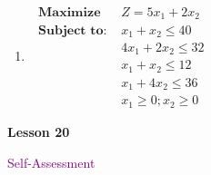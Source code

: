 \documentclass[10pt]{book}
\theoremstyle{definition}
\theoremstyle{remark}
\begin{document}
\begin{large}
\begin{enumerate}
\item $\begin{array}{ll} 
\textbf { Maximize } & Z=5x_{1}+2x_{2} \\ 
\textbf { Subject to: } &  x_{1}+x_{2} \leq 40 \\ 
&  4x_{1}+2x_{2} \leq 32\\ 
&  x_{1}+x_{2} \leq 12\\ 
&  x_{1}+4x_{2} \leq 36\\ 
& x_{1} \geq 0 ; x_{2} \geq 0 
\end{array}\nonumber$
\end{enumerate}
\end{large}
\newpage


\begin{tcolorbox}[
  width=\textwidth,
  colback=gray!10, %
  colframe=white, %
  boxrule=0pt,    %
  left=1cm,       %
  right=1cm,      %
  sharp corners  %
]

\begin{minipage}[t]{0.5\textwidth}
  \Huge \textbf{Lesson 20}
\end{minipage}%
\hfill
\begin{minipage}[t]{0.5\textwidth}
  \Huge\textcolor{purple}{Self-Assessment}
\end{minipage}
\end{tcolorbox}
\end{document}
